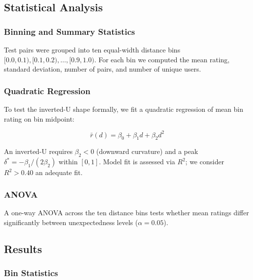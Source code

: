 \subsection{Statistical Analysis}

\subsubsection{Binning and Summary Statistics}

Test pairs were grouped into ten equal-width distance bins $[0.0, 0.1),
[0.1, 0.2), \ldots, [0.9, 1.0)$.  For each bin we computed the mean rating,
standard deviation, number of pairs, and number of unique users.

\subsubsection{Quadratic Regression}

To test the inverted-U shape formally, we fit a quadratic regression of mean
bin rating on bin midpoint:

\begin{equation}
    \bar{r}(d) = \beta_0 + \beta_1 d + \beta_2 d^2
    \label{eq:quadratic}
\end{equation}

An inverted-U requires $\beta_2 < 0$ (downward curvature) and a peak
$\delta^* = -\beta_1 / (2\beta_2)$ within $[0, 1]$.  Model fit is assessed
via $R^2$; we consider $R^2 > 0.40$ an adequate fit.

\subsubsection{ANOVA}

A one-way ANOVA across the ten distance bins tests whether mean ratings differ
significantly between unexpectedness levels ($\alpha = 0.05$).

\subsection{Results}

\subsubsection{Bin Statistics}

